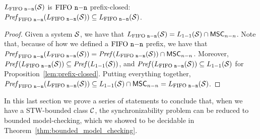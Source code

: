 \begin{proposition}\label{lem:nn-prefix-closed}
	$\nnL{\Sys}$ is $\nn$ prefix-closed:
	$\Prefnn{\nnL{\Sys}} \subseteq \nnL{\Sys}$.
\end{proposition}
\begin{proof}
	Given a system $\System$, we have that $\nnL{\System} = \ppL{\System} \cap \nnMSCs$. Note that, because of how we defined a $\nn$ prefix, we have that $\Prefnn{\nnL{\Sys}} = \Pref{\nnL{\Sys}} \cap \nnMSCs$. Moreover, $\Pref{\nnL{\Sys}} \subseteq \Pref{\ppL{\Sys}}$, and $\Pref{\nnL{\Sys}} \subseteq \ppL{\Sys}$ for Proposition~\ref{lem:prefix-closed}. Putting everything together, $\Prefnn{\nnL{\Sys}} \subseteq \ppL{\Sys} \cap \nnMSCs = \nnL{\System}$.
\end{proof}

In this last section we prove a series of statements to conclude that, when we have a STW-bounded class $\Class$, the synchronizability problem can be reduced to bounded model-checking, which we showed to be decidable in Theorem~\ref{thm:bounded_model_checking}.


